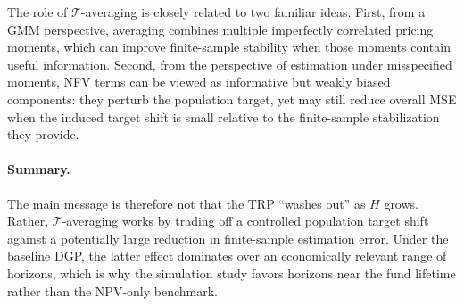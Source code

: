 \begin{remark}
	The role of $\mathcal{T}$-averaging is closely related to two familiar ideas.
	First, from a GMM perspective, averaging combines multiple imperfectly correlated pricing moments, which can improve finite-sample stability when those moments contain useful information.
	Second, from the perspective of estimation under misspecified moments, NFV terms can be viewed as informative but weakly biased components: they perturb the population target, yet may still reduce overall MSE when the induced target shift is small relative to the finite-sample stabilization they provide.
\end{remark}

\paragraph{Summary.}
The main message is therefore not that the TRP ``washes out'' as $H$ grows.
Rather, $\mathcal{T}$-averaging works by trading off a controlled population target shift against a potentially large reduction in finite-sample estimation error.
Under the baseline DGP, the latter effect dominates over an economically relevant range of horizons, which is why the simulation study favors horizons near the fund lifetime rather than the NPV-only benchmark.